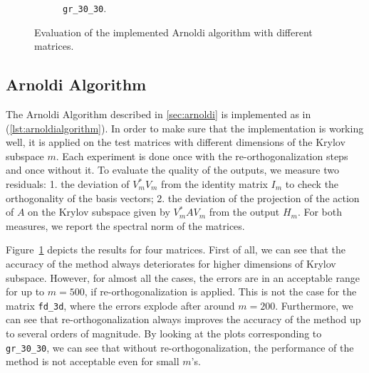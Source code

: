 \begin{figure}[h!]
\begin{subfigure}[b]{0.45\textwidth}
        \caption{\texttt{gr\_30\_30}.}
    \end{subfigure}
    \caption{Evaluation of the implemented Arnoldi algorithm with different matrices.}
    \label{fig:arnoldievaluation}
\end{figure}

\subsection{Arnoldi Algorithm}
The Arnoldi Algorithm described in \autoref{sec:arnoldi} is implemented as in (\autoref{lst:arnoldialgorithm}).
In order to make sure that the implementation is working well, it is applied on the test matrices with different
dimensions of the Krylov subspace $m$. Each experiment is done once with the re-orthogonalization steps and once
without it. To evaluate the quality of the outputs, we measure two residuals: 1. the deviation of $V_m^* V_m$ from the
identity matrix $I_m$ to check the orthogonality of the basis vectors; 2. the deviation of the projection of the
action of $A$ on the Krylov subspace given by $V_m^* A V_m$ from the output $H_m$. For both measures, we report the
spectral norm of the matrices.

Figure~\ref{fig:arnoldievaluation} depicts the results for four matrices. First of all, we can see that the accuracy
of the method always deteriorates for higher dimensions of Krylov subspace. However, for almost all the cases, the
errors are in an acceptable range for up to $m=500$, if re-orthogonalization is applied. This is not the case for the
matrix \texttt{fd\_3d}, where the errors explode after around $m=200$. Furthermore, we can see that re-orthogonalization
always improves the accuracy of the method up to several orders of magnitude. By looking at the plots corresponding to \texttt{gr\_30\_30}, we can see that without re-orthogonalization,
the performance of the method is not acceptable even for small $m$'s.

